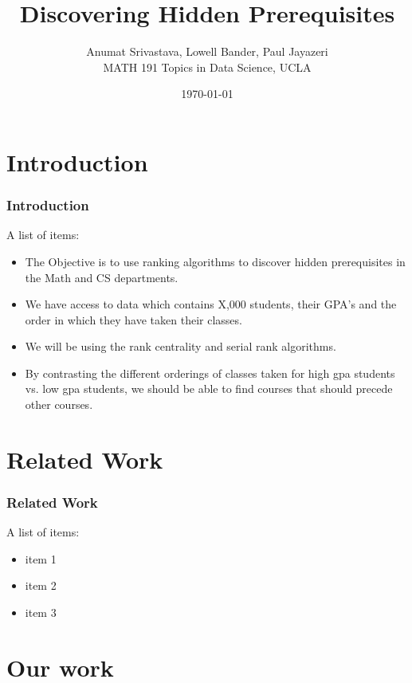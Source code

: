 \documentclass{beamer}
\title{Discovering Hidden Prerequisites}
\author{ Anumat Srivastava, Lowell Bander, Paul Jayazeri\\
\vspace{5mm}
MATH 191 Topics in Data Science, UCLA}
\date{ \today}
\begin{document}
\newtheorem{theo}{Theorem}
\newtheorem{lem}{Lemma}
\newtheorem{defin}{Definition}
\newtheorem{prop}{Proposition}
\newtheorem{ex}{Example}
\newtheorem{alg}{Algorithm}
\newtheorem{cor}{Corollary}
\newtheorem{case}{Case}


\begin{frame}
  \titlepage
\end{frame}



\section{Introduction}

\begin{frame}
     \frametitle{Introduction}
A list of items:
\begin{itemize}
\item The Objective is to use ranking algorithms to discover hidden prerequisites in the Math and CS departments.
\item  We have access to data which contains X,000 students, their GPA's and the order in which they have taken their classes.
\item  We will be using the rank centrality and serial rank algorithms.
\item By contrasting the different orderings of classes taken for high gpa students vs. low gpa students, we should be able to find courses that should precede other courses.
\end{itemize}
\end{frame}



\section{Related Work}

\begin{frame}
     \frametitle{Related Work}
A list of items:
\begin{itemize}
\item item 1
\item  item 2
\item  item 3
\end{itemize}
\end{frame}




 


\section{Our work}    \label{sec:ourWork}
\end{document}
